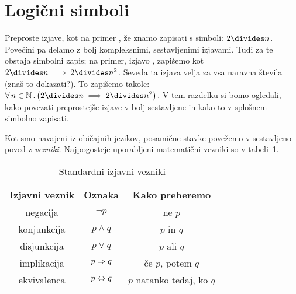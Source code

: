 		
	
	
	\section{Logični simboli}\label{RAZDELEK: Logični simboli}
	
		Preproste izjave, kot na primer , že znamo zapisati s simboli: $2 \divides n$. Povečini pa delamo z bolj kompleksnimi, sestavljenimi izjavami. Tudi za te obstaja simbolni zapis; na primer, izjavo , zapišemo kot $2 \divides n \implies 2 \divides n^2$. Seveda ta izjava velja za vsa naravna števila (znaš to dokazati?). To zapišemo takole: $\all{n}[\NN]{2 \divides n \implies 2 \divides n^2}$. V tem razdelku si bomo ogledali, kako povezati preprostejše izjave v bolj sestavljene in kako to v splošnem simbolno zapisati.
		
		Kot smo navajeni iz običajnih jezikov, posamične stavke povežemo v sestavljeno poved z \emph{vezniki}. Najpogosteje uporabljeni matematični vezniki so v tabeli~\ref{TABELA: Standardni izjavni vezniki}.
		
		\begin{table}[!ht]
			\centering
			\begin{tabular}{|ccc|}
				\hline
				\textbf{Izjavni veznik} & \textbf{Oznaka} & \textbf{Kako preberemo} \\
				\hline
				negacija & $\lnot{p}$ & ne $p$ \\
				konjunkcija & $p \land q$ & $p$ in $q$ \\
				disjunkcija & $p \lor q$ & $p$ ali $q$ \\
				implikacija & $p \Rightarrow q$ & če $p$, potem $q$ \\
				ekvivalenca & $p \Leftrightarrow q$ & $p$ natanko tedaj, ko $q$ \\
				\hline
			\end{tabular}
			\caption{Standardni izjavni vezniki}\label{TABELA: Standardni izjavni vezniki}
		\end{table}
		
